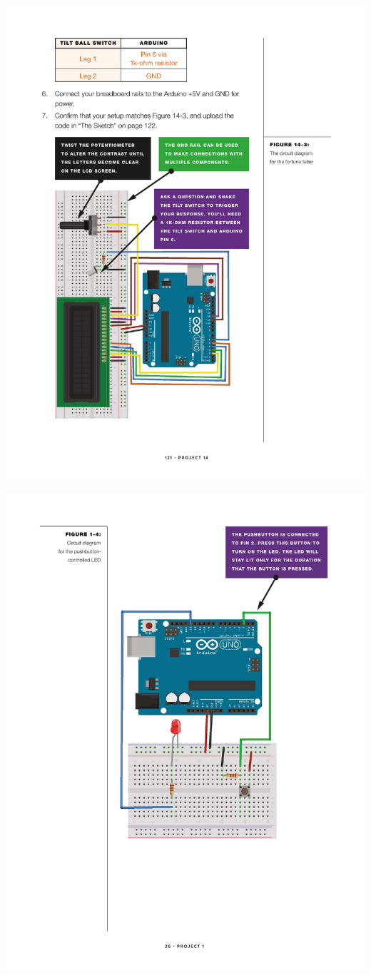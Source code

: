 \documentclass[11pt]{article}
\begin{document}
\begin{center}
\includegraphics[width=.9\linewidth]{./exp4-magic-8ball-5.pdf}
\end{center}

\begin{center}
\includegraphics[width=.9\linewidth]{./exp4-magic-8ball-6.pdf}
\end{center}
\end{document}
